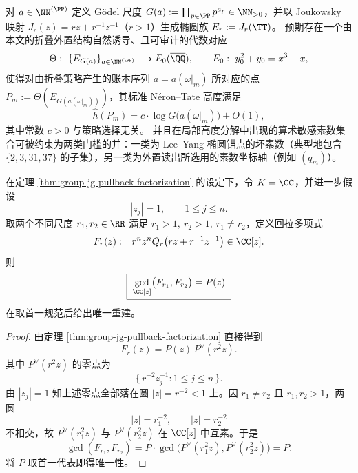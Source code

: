 \begin{conjecture}\label{conj:group-jg-ledger-nt-height-principle}
对 \(a\in\NN^{(\PP)}\) 定义 Gödel 尺度
\(
G(a):=\prod_{p\in\PP}p^{a_p}\in\NN_{>0}
\)，并以 Joukowsky 映射 \(J_r(z)=r z+r^{-1}z^{-1}\)（\(r>1\)）生成椭圆族 \(E_r:=J_r(\TT)\)。
预期存在一个由本文的折叠外置结构自然诱导、且可审计的代数对应
\[
\Theta:\ \{E_{G(a)}\}_{a\in\NN^{(\PP)}}\dashrightarrow E_0(\overline{\QQ}),
\qquad
E_0:\ y_0^2+y_0=x^3-x,
\]
使得对由折叠策略产生的账本序列 \(a=a(\omega|_m)\) 所对应的点 \(P_m:=\Theta(E_{G(a(\omega|_m))})\)，其标准 N\'eron--Tate 高度满足
\[
\widehat h(P_m)=c\cdot \log G\bigl(a(\omega|_m)\bigr)+O(1),
\]
其中常数 \(c>0\) 与策略选择无关。
并且在局部高度分解中出现的算术敏感素数集合可被约束为两类门槛的并：一类为 Lee--Yang 椭圆锚点的坏素数（典型地包含 \(\{2,3,31,37\}\) 的子集），另一类为外置读出所选用的素数坐标轴（例如 \((q_m)\)）。
\end{conjecture}

\begin{theorem}\label{thm:group-two-scale-holographic-recovery}
在定理 \ref{thm:group-jg-pullback-factorization} 的设定下，令 \(K=\CC\)，并进一步假设
\[
|z_j|=1,\qquad 1\le j\le n.
\]
取两个不同尺度 \(r_1,r_2\in\RR\) 满足 \(r_1>1,\ r_2>1,\ r_1\neq r_2\)，定义回拉多项式
\[
F_r(z):=r^n z^n Q_r\!\left(r z+r^{-1}z^{-1}\right)\in \CC[z].
\]
则
\[
\boxed{\;
\gcd_{\CC[z]}\bigl(F_{r_1},F_{r_2}\bigr)=P(z)
\;}
\]
在取首一规范后给出唯一重建。
\end{theorem}
\begin{proof}
由定理 \ref{thm:group-jg-pullback-factorization} 直接得到
\[
F_r(z)=P(z)\,P^{\vee}(r^2 z).
\]
其中 \(P^{\vee}(r^2 z)\) 的零点为
\[
\{\,r^{-2} z_j^{-1}:1\le j\le n\,\}.
\]
由 \(|z_j|=1\) 知上述零点全部落在圆 \(|z|=r^{-2}<1\) 上。因 \(r_1\neq r_2\) 且 \(r_1,r_2>1\)，两圆
\[
|z|=r_1^{-2},\qquad |z|=r_2^{-2}
\]
不相交，故 \(P^{\vee}(r_1^2 z)\) 与 \(P^{\vee}(r_2^2 z)\) 在 \(\CC[z]\) 中互素。于是
\[
\gcd(F_{r_1},F_{r_2})
=P\cdot \gcd\!\bigl(P^{\vee}(r_1^2 z),P^{\vee}(r_2^2 z)\bigr)
=P.
\]
将 \(P\) 取首一代表即得唯一性。
\end{proof}

